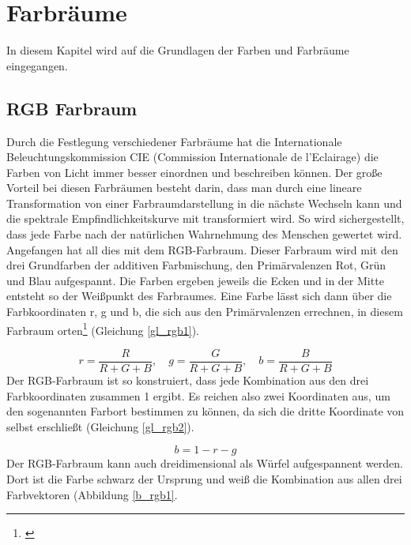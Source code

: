 \chapter{Farbräume} 
In diesem Kapitel wird auf die Grundlagen der Farben und Farbräume eingegangen.
 
\section{RGB Farbraum} \label{sec_rgb}
Durch die Festlegung verschiedener Farbräume hat die  Internationale Beleuchtungskommission CIE (\glqq Commission Internationale de l'Eclairage\grqq) die Farben von Licht immer besser einordnen und beschreiben können. Der große Vorteil bei diesen Farbräumen besteht darin, dass man durch eine lineare Transformation von einer Farbraumdarstellung in die nächste Wechseln kann und die spektrale Empfindlichkeitskurve mit transformiert wird. So wird sichergestellt, dass jede Farbe nach der natürlichen Wahrnehmung des Menschen gewertet wird.
Angefangen hat all dies mit dem RGB-Farbraum. Dieser Farbraum wird mit den drei Grundfarben der additiven Farbmischung, den Primärvalenzen Rot, Grün und Blau aufgespannt. Die Farben ergeben jeweils die Ecken und in der Mitte entsteht so der Weißpunkt des Farbraumes. Eine Farbe lässt sich dann über die Farbkoordinaten r, g und b, die sich aus den Primärvalenzen errechnen, in diesem Farbraum orten\footnote{\cite[106]{hentschel}} (Gleichung \ref{gl_rgb1}).

\begin{equation}\label{gl_rgb1}
		r = \frac{R}{R+G+B},\quad g = \frac{G}{R+G+B},\quad b = \frac{B}{R+G+B}
\end{equation}
Der RGB-Farbraum ist so konstruiert, dass jede Kombination aus den drei Farbkoordinaten zusammen 1 ergibt. Es reichen also zwei Koordinaten aus, um den sogenannten Farbort bestimmen zu können, da sich die dritte Koordinate von selbst erschließt (Gleichung \ref{gl_rgb2}). 

\begin{equation}\label{gl_rgb2}
		b=1-r-g
\end{equation}
Der RGB-Farbraum kann auch dreidimensional als Würfel aufgespannent werden. Dort ist die Farbe schwarz der Ursprung und weiß die Kombination aus allen drei Farbvektoren (Abbildung \ref{b_rgb1}.

